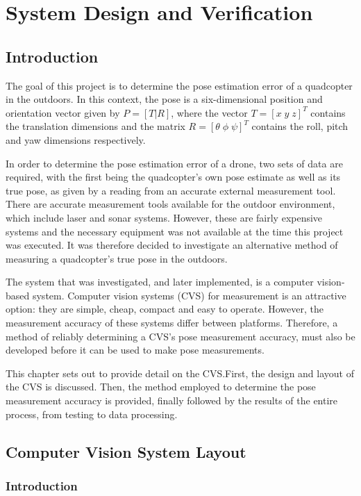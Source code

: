 \chapter{System Design and Verification}

\section{Introduction}

The goal of this project is to determine the pose estimation error of a quadcopter in the outdoors. In this context, the pose is a six-dimensional position and orientation vector given by $P = [T | R]$, where the vector $T = [x\;y\;z]^T$ contains the translation dimensions and the matrix $R = [\theta\;\phi\;\psi]^T$ contains the roll, pitch and yaw dimensions respectively. 

In order to determine the pose estimation error of a drone, two sets of data are required, with the first being the quadcopter's own pose estimate as well as its true pose, as given by a reading from an accurate external measurement tool. There are accurate measurement tools available for the outdoor environment, which include laser and sonar systems. However, these are fairly expensive systems and the necessary equipment was not available at the time this project was executed. It was therefore decided to investigate an alternative method of measuring a quadcopter's true pose in the outdoors.

The system that was investigated, and later implemented, is a computer vision-based system. Computer vision systems (CVS) for measurement is an attractive option: they are simple, cheap, compact and easy to operate. However, the measurement accuracy of these systems differ between platforms. Therefore, a method of reliably determining a CVS's pose measurement accuracy, must also be developed before it can be used to make pose measurements.  

This chapter sets out to provide detail on the CVS.\@ First, the design and layout of the CVS is discussed. Then, the method employed to determine the pose measurement accuracy is provided, finally followed by the results of the entire process, from testing to data processing.

\section{Computer Vision System Layout}

\subsection{Introduction}

